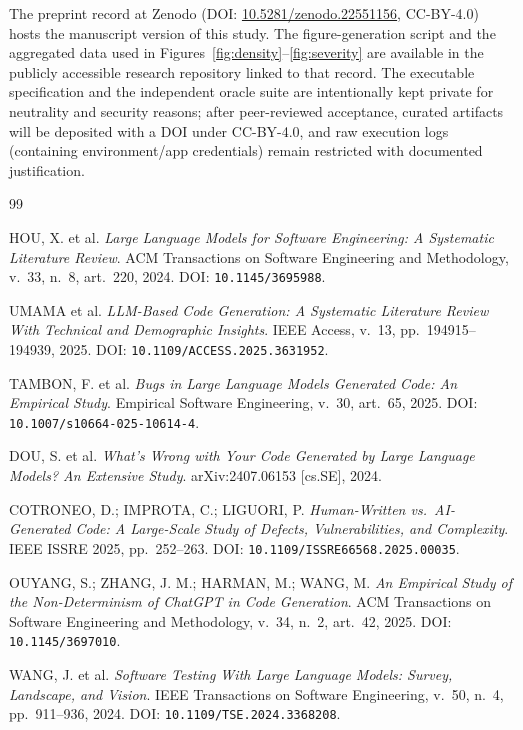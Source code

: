 \documentclass[11pt]{article}
\begin{document}
The preprint record at Zenodo (DOI: \href{https://zenodo.org/records/22551156}{10.5281/zenodo.22551156}, CC-BY-4.0) hosts the manuscript version of this study. The figure-generation script and the aggregated data used in Figures~\ref{fig:density}--\ref{fig:severity} are available in the publicly accessible research repository linked to that record. The executable specification and the independent oracle suite are intentionally kept private for neutrality and security reasons; after peer-reviewed acceptance, curated artifacts will be deposited with a DOI under CC-BY-4.0, and raw execution logs (containing environment/app credentials) remain restricted with documented justification.

\begin{thebibliography}{99}\label{sec:refs}

 HOU, X. et al. \emph{Large Language Models for Software Engineering: A Systematic Literature Review}. ACM Transactions on Software Engineering and Methodology, v.~33, n.~8, art.~220, 2024. DOI: \texttt{10.1145/3695988}.

 UMAMA et al. \emph{LLM-Based Code Generation: A Systematic Literature Review With Technical and Demographic Insights}. IEEE Access, v.~13, pp.~194915--194939, 2025. DOI: \texttt{10.1109/ACCESS.2025.3631952}.

 TAMBON, F. et al. \emph{Bugs in Large Language Models Generated Code: An Empirical Study}. Empirical Software Engineering, v.~30, art.~65, 2025. DOI: \texttt{10.1007/s10664-025-10614-4}.

 DOU, S. et al. \emph{What's Wrong with Your Code Generated by Large Language Models? An Extensive Study}. arXiv:2407.06153 {[cs.SE]}, 2024.

 COTRONEO, D.; IMPROTA, C.; LIGUORI, P. \emph{Human-Written vs.\ AI-Generated Code: A Large-Scale Study of Defects, Vulnerabilities, and Complexity}. IEEE ISSRE 2025, pp.~252--263. DOI: \texttt{10.1109/ISSRE66568.2025.00035}.

 OUYANG, S.; ZHANG, J. M.; HARMAN, M.; WANG, M. \emph{An Empirical Study of the Non-Determinism of ChatGPT in Code Generation}. ACM Transactions on Software Engineering and Methodology, v.~34, n.~2, art.~42, 2025. DOI: \texttt{10.1145/3697010}.

 WANG, J. et al. \emph{Software Testing With Large Language Models: Survey, Landscape, and Vision}. IEEE Transactions on Software Engineering, v.~50, n.~4, pp.~911--936, 2024. DOI: \texttt{10.1109/TSE.2024.3368208}.


\end{thebibliography}
\end{document}
